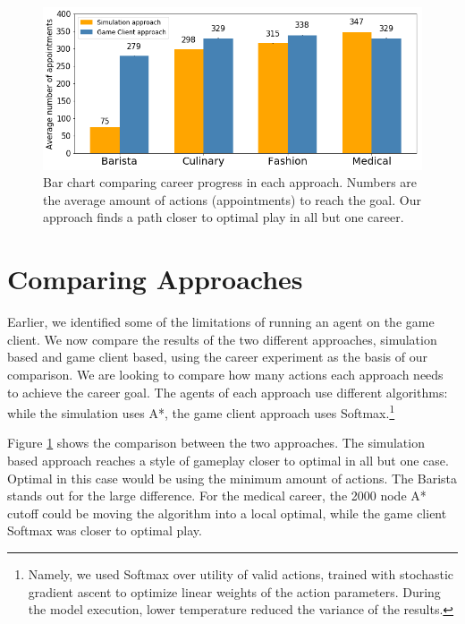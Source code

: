 \documentclass[letterpaper]{article} %
\begin{document}
\begin{figure}[t]
  \centering
  \includegraphics[width=1.0\linewidth]{images/career_approach_comparison.png}
  \caption{Bar chart comparing career progress in each approach. Numbers are the average amount of actions (appointments) to reach the goal. Our approach finds a path closer to optimal play in all but one career.}
  \label{Figure:career_approach_comp}
\end{figure}

\section{Comparing Approaches}

Earlier, we identified some of the limitations of running an agent on the game client. We now compare the results of the two different approaches, simulation based and  game client based, using the career experiment as the basis of our comparison. We are looking to compare how many actions each approach needs to achieve the career goal. The agents of each approach use different algorithms: while the simulation uses A*, the game client approach uses Softmax.\footnote{Namely, we used Softmax over utility of valid actions, trained with stochastic gradient ascent to optimize linear weights of the action parameters.
During the model execution, lower temperature reduced the variance of the results.
}

Figure \ref{Figure:career_approach_comp} shows the comparison between the two approaches. The simulation based approach reaches a style of gameplay closer to optimal in all but one case. Optimal in this case would be using the minimum amount of actions. The Barista stands out for the large difference. For the medical career, the 2000 node A* cutoff could be moving the algorithm into a local optimal, while the game client Softmax was closer to optimal play.
\end{document}
